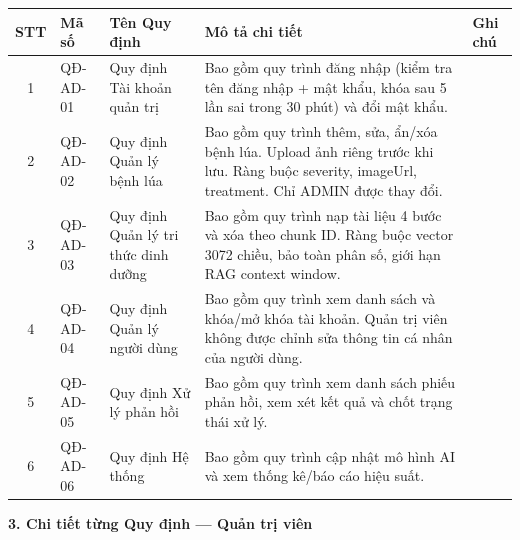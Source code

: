 \documentclass[12pt,a4paper]{article}
\begin{document}
\begin{longtable}{|
        c|
        >{\raggedright\arraybackslash}p{1.8cm}|
        >{\raggedright\arraybackslash}p{3.4cm}|
        >{\raggedright\arraybackslash}p{6.4cm}|
        >{\raggedright\arraybackslash}p{1.4cm}|}
    \hline
    \rowcolor{headerblue}
    \textbf{STT} & \textbf{Mã số} & \textbf{Tên Quy định}                & \textbf{Mô tả chi tiết}                                                                                                                         & \textbf{Ghi chú} \\
    \hline
    \endhead
    1            & QĐ-AD-01       & Quy định Tài khoản quản trị          & Bao gồm quy trình đăng nhập (kiểm tra tên đăng nhập + mật khẩu, khóa sau 5 lần sai trong 30 phút) và đổi mật khẩu.                              &                  \\
    \hline
    2            & QĐ-AD-02       & Quy định Quản lý bệnh lúa            & Bao gồm quy trình thêm, sửa, ẩn/xóa bệnh lúa. Upload ảnh riêng trước khi lưu. Ràng buộc severity, imageUrl, treatment. Chỉ ADMIN được thay đổi. &                  \\
    \hline
    3            & QĐ-AD-03       & Quy định Quản lý tri thức dinh dưỡng & Bao gồm quy trình nạp tài liệu 4 bước và xóa theo chunk ID. Ràng buộc vector 3072 chiều, bảo toàn phân số, giới hạn RAG context window.          &                  \\
    \hline
    4            & QĐ-AD-04       & Quy định Quản lý người dùng          & Bao gồm quy trình xem danh sách và khóa/mở khóa tài khoản. Quản trị viên không được chỉnh sửa thông tin cá nhân của người dùng.                 &                  \\
    \hline
    5            & QĐ-AD-05       & Quy định Xử lý phản hồi              & Bao gồm quy trình xem danh sách phiếu phản hồi, xem xét kết quả và chốt trạng thái xử lý.                                                      &                  \\
    \hline
    6            & QĐ-AD-06       & Quy định Hệ thống                    & Bao gồm quy trình cập nhật mô hình AI và xem thống kê/báo cáo hiệu suất.                                                                       &                  \\
    \hline
\end{longtable}
 
\vspace{0.3cm}
\textbf{3. Chi tiết từng Quy định --- Quản trị viên}
 
\end{document}
